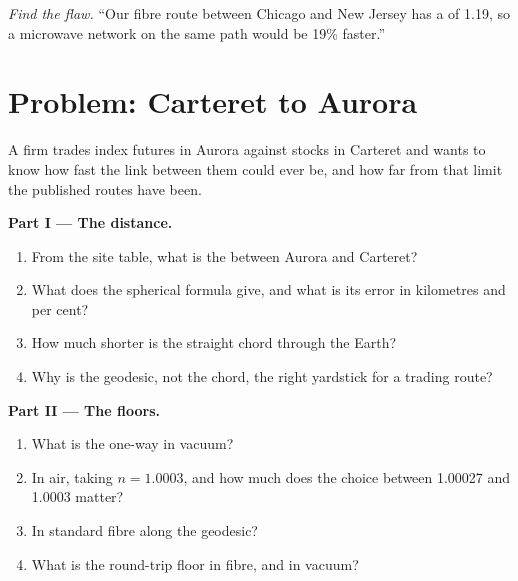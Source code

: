 \begin{exercise}[$\star\star\star$]\label{exo:nw:the-north-american-map:8}
\emph{Find the flaw.} ``Our fibre route between Chicago and New Jersey has a  of 1.19, so a microwave network on the same path would
be 19\% faster.''
\end{exercise}

\section{Problem: Carteret to Aurora}

\begin{problem}\label{pb:nw:the-north-american-map:1}
A firm trades index futures in Aurora against stocks in Carteret and wants to know how fast the link between them could ever be, and how far
from that limit the published routes have been.

\medskip\noindent\textbf{Part I --- The distance.}
\begin{enumerate}
\item From the site table, what is the  between Aurora and Carteret?
\item What does the spherical formula give, and what is its error in kilometres and per cent?
\item How much shorter is the straight chord through the Earth?
\item Why is the geodesic, not the chord, the right yardstick for a trading route?
\end{enumerate}

\medskip\noindent\textbf{Part II --- The floors.}
\begin{enumerate}[resume]
\item What is the one-way  in vacuum?
\item In air, taking $n = 1.0003$, and how much does the choice between 1.00027 and 1.0003 matter?
\item In standard fibre along the geodesic?
\item What is the round-trip floor in fibre, and in vacuum?
\end{enumerate}


\end{problem}
